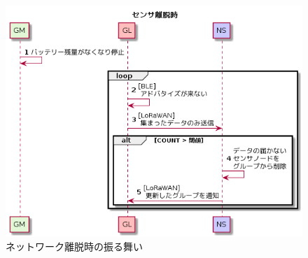 \begin{figure}[]
    \begin{center}
        \includegraphics[width=13cm]{figures/v2.0/センサ離脱時.png}
    \caption{ネットワーク離脱時の振る舞い}
    \label{fig:group_on_leave}
    \end{center}
\end{figure}